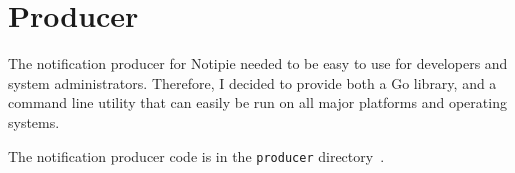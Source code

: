 \section{Producer}\label{sec:producer}

The notification producer for Notipie
needed to be easy to use for developers
and system administrators.
Therefore,
I decided to provide both a Go library,
and a command line utility
that can easily be run on all major platforms
and operating systems.

The notification producer code
is in the
\texttt{producer} directory~\cite{sewera_notipie_2022-4}.



